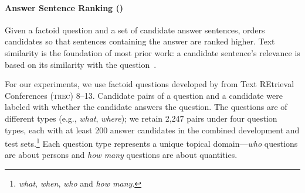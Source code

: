 \paragraph{Answer Sentence Ranking (\asr{})}
\label{section:tasks-and-datasets-asr}

Given a factoid question and a set of candidate answer sentences,
\asr{} orders candidates so that sentences containing the
answer are ranked higher.  Text similarity is the foundation of most
prior work: a candidate sentence's relevance is based on its
similarity with the question~\cite{Wang:2007,Yao:2013,Severyn:2015}.

For our \asr{} experiments, we use factoid questions developed by
 from Text REtrieval Conferences (\textsc{trec})
8--13.  Candidate \qa{} pairs of a question and a candidate were
labeled with whether the candidate answers the question.  The
questions are of different types (e.g., \emph{what}, \emph{where}); we
retain 2,247
\qa{} pairs under four question types, each with at least 200 answer candidates in the combined
development and test sets.\footnote{\emph{what}, \emph{when},
\emph{who} and \emph{how many}.}  Each question type represents a
unique topical domain---\emph{who} questions are about persons and
\emph{how many} questions are about quantities.
